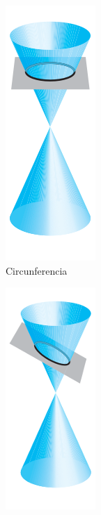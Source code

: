 \begin{frame}
	\begin{figure}		
		\begin{subfigure}[b]{0.22\textwidth}
			\centering
			\includegraphics[height=\textwidth]{imagenes/conica1}
			\caption{Circunferencia}
		\end{subfigure}
		\hspace{2mm}
		\begin{subfigure}[b]{0.22\textwidth}
			\centering
			\includegraphics[height=\textwidth]{imagenes/conica2}

\end{subfigure}
\end{figure}
\end{frame}
